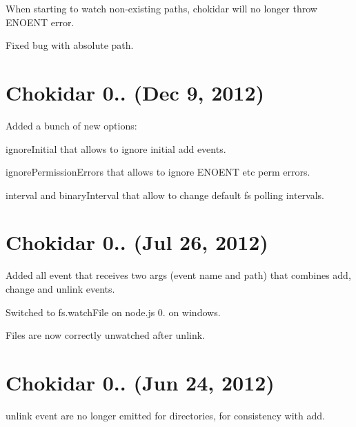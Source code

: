 \begin{DoxyItemize}
\item When starting to watch non-\/existing paths, chokidar will no longer throw E\+N\+O\+E\+NT error.
\item Fixed bug with absolute path.
\end{DoxyItemize}

\section*{Chokidar 0.. (Dec 9, 2012)}


\begin{DoxyItemize}
\item Added a bunch of new options\+:
\begin{DoxyItemize}
\item {\ttfamily ignore\+Initial} that allows to ignore initial {\ttfamily add} events.
\item {\ttfamily ignore\+Permission\+Errors} that allows to ignore E\+N\+O\+E\+NT etc perm errors.
\item {\ttfamily interval} and {\ttfamily binary\+Interval} that allow to change default fs polling intervals.
\end{DoxyItemize}
\end{DoxyItemize}

\section*{Chokidar 0.. (Jul 26, 2012)}


\begin{DoxyItemize}
\item Added {\ttfamily all} event that receives two args (event name and path) that combines {\ttfamily add}, {\ttfamily change} and {\ttfamily unlink} events.
\item Switched to {\ttfamily fs.\+watch\+File} on node.\+js 0. on windows.
\item Files are now correctly unwatched after unlink.
\end{DoxyItemize}

\section*{Chokidar 0.. (Jun 24, 2012)}


\begin{DoxyItemize}
\item {\ttfamily unlink} event are no longer emitted for directories, for consistency with {\ttfamily add}.
\end{DoxyItemize}

